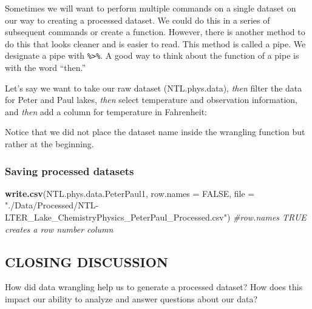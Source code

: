 \documentclass[]{article}
\newenvironment{Shaded}{\begin{snugshade}}{\end{snugshade}}
\newcommand{\KeywordTok}[1]{\textcolor[rgb]{0.13,0.29,0.53}{\textbf{#1}}}
\newcommand{\DataTypeTok}[1]{\textcolor[rgb]{0.13,0.29,0.53}{#1}}
\newcommand{\DecValTok}[1]{\textcolor[rgb]{0.00,0.00,0.81}{#1}}
\newcommand{\StringTok}[1]{\textcolor[rgb]{0.31,0.60,0.02}{#1}}
\newcommand{\CommentTok}[1]{\textcolor[rgb]{0.56,0.35,0.01}{\textit{#1}}}
\newcommand{\OtherTok}[1]{\textcolor[rgb]{0.56,0.35,0.01}{#1}}
\newcommand{\OperatorTok}[1]{\textcolor[rgb]{0.81,0.36,0.00}{\textbf{#1}}}
\newcommand{\NormalTok}[1]{#1}
\begin{document}
Sometimes we will want to perform multiple commands on a single dataset
on our way to creating a processed dataset. We could do this in a series
of subsequent commands or create a function. However, there is another
method to do this that looks cleaner and is easier to read. This method
is called a pipe. We designate a pipe with \texttt{\%\textgreater{}\%}.
A good way to think about the function of a pipe is with the word
``then.''

Let's say we want to take our raw dataset (NTL.phys.data), \emph{then}
filter the data for Peter and Paul lakes, \emph{then} select temperature
and observation information, and \emph{then} add a column for
temperature in Fahrenheit:

\begin{Shaded}
\end{Shaded}

Notice that we did not place the dataset name inside the wrangling
function but rather at the beginning.

\subsubsection{Saving processed
datasets}\label{saving-processed-datasets}

\begin{Shaded}
\begin{Highlighting}[]
\KeywordTok{write.csv}\NormalTok{(NTL.phys.data.PeterPaul1, }\DataTypeTok{row.names =} \OtherTok{FALSE}\NormalTok{, }\DataTypeTok{file =}    
\StringTok{"./Data/Processed/NTL-LTER_Lake_ChemistryPhysics_PeterPaul_Processed.csv"}\NormalTok{)}
\CommentTok{#row.names TRUE creates a row number column}
\end{Highlighting}
\end{Shaded}

\subsection{CLOSING DISCUSSION}\label{closing-discussion}

How did data wrangling help us to generate a processed dataset? How does
this impact our ability to analyze and answer questions about our data?
\end{document}
